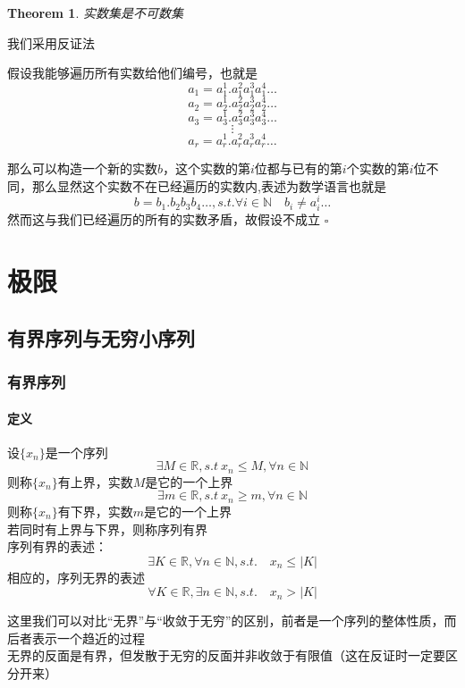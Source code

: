 \documentclass[11pt,hyperref,a4paper,UTF8]{ctexart}
\newtheorem{theorem}{Theorem}[subsection]
\newenvironment{cproof}{%
\heiti{证明}\kaishu
}{%
  \hfill $\square$
  \par\bigskip
}
\begin{document}
\begin{CJK}{UTF8}{gkai}
\begin{theorem}
  实数集是不可数集
\end{theorem}

\begin{cproof}
  我们采用反证法

  假设我能够遍历所有实数给他们编号，也就是
  \[a_1=a_1^1.a_1^2  a_1^3  a_1^4  \ldots\]
  \[a_2=a_2^1.a_2^2  a_2^3  a_2^4  \ldots\]
  \[a_3=a_3^1.a_3^2  a_3^3  a_3^4  \ldots\]
  \[\vdots\]
  \[a_r=a_r^1.   a_r^2   a_r^3   a_r^4  \ldots\]

  那么可以构造一个新的实数$b$，这个实数的第$i$位都与已有的第$i$个实数的第$i$位不同，那么显然这个实数不在已经遍历的实数内,表述为数学语言也就是
  \[b=b_1.b_2b_3b_4\ldots,s.t.\forall i \in \mathbb{N} \quad  b_i\neq a_i^i \ldots\]
  然而这与我们已经遍历的所有的实数矛盾，故假设不成立
\end{cproof}

\newpage
\section{极限}
\subsection{有界序列与无穷小序列}
\subsubsection{有界序列}
\paragraph{定义\\}

设$\{x_n\}$是一个序列\\
\[\exists M\in\mathbb{R},s.t~ x_n\leq M ,\forall n\in \mathbb{N}\]
则称$\{x_n\}$有上界，实数$M$是它的一个上界
\[\exists m\in\mathbb{R},s.t~ x_n\geq m ,\forall n\in \mathbb{N}\]
则称$\{x_n\}$有下界，实数$m$是它的一个上界\\
若同时有上界与下界，则称序列有界\\
序列有界的表述：
\[\exists K\in \mathbb{R},\forall n\in \mathbb{N},s.t.\quad x_n\leq |K|\]
相应的，序列无界的表述
\[\forall K\in \mathbb{R},\exists n\in \mathbb{N},s.t.\quad  x_n  >  |K|\]

这里我们可以对比“无界”与“收敛于无穷”的区别，前者是一个序列的整体性质，而后者表示一个趋近的过程\\
无界的反面是有界，但发散于无穷的反面并非收敛于有限值（这在反证时一定要区分开来）\\

\end{CJK}
\end{document}
